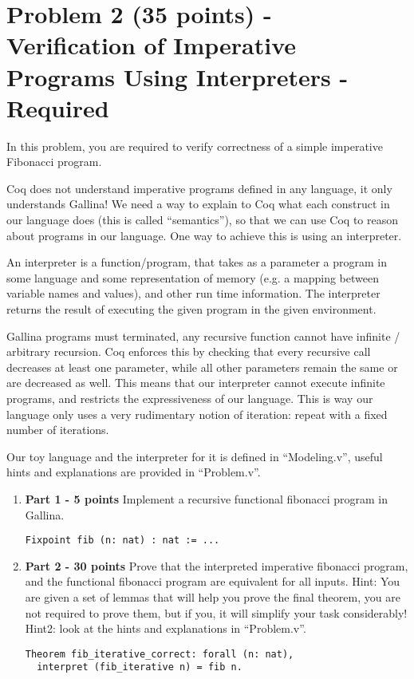 \documentclass{article}
\begin{document}
\section{Problem 2 (35 points) - Verification of Imperative Programs Using Interpreters - Required}
In this problem, you are required to verify correctness of a simple imperative Fibonacci program.

Coq does not understand imperative programs defined in any language, it only understands Gallina! We need a way
to explain to Coq what each construct in our language does (this is called ``semantics''), so that we can use Coq 
to reason about programs in our language. One way to achieve this is using an interpreter.

An interpreter is a function/program, that takes as a parameter a program
in some language and some representation of memory (e.g. a mapping between variable
names and values), and other run time information. The interpreter returns the result of executing the given program in the
given environment.

Gallina programs must terminated, any recursive function cannot have infinite / arbitrary recursion. Coq enforces this by checking that
every recursive call decreases at least one parameter, while all other parameters remain the same or are decreased as well. This means
that our interpreter cannot execute infinite programs, and restricts the expressiveness of our language. This is way our language only
uses a very rudimentary notion of iteration: repeat with a fixed number of iterations.

Our toy language and the interpreter for it is defined in ``Modeling.v'', useful hints and explanations are provided in ``Problem.v''.

\begin{enumerate}
\item \textbf{Part 1 - 5 points} Implement a recursive functional fibonacci program in Gallina.
\begin{verbatim}
Fixpoint fib (n: nat) : nat := ...
\end{verbatim}

\item \textbf{Part 2 - 30 points} Prove that the interpreted imperative fibonacci program, and the functional fibonacci program are equivalent for all
inputs. Hint: You are given a set of lemmas that will help you prove the final theorem, you are not required to prove them, but if you, it will simplify
your task considerably! Hint2: look at the hints and explanations in ``Problem.v''.
\begin{verbatim}
Theorem fib_iterative_correct: forall (n: nat),
  interpret (fib_iterative n) = fib n.
\end{verbatim}
\end{enumerate}
\end{document}
